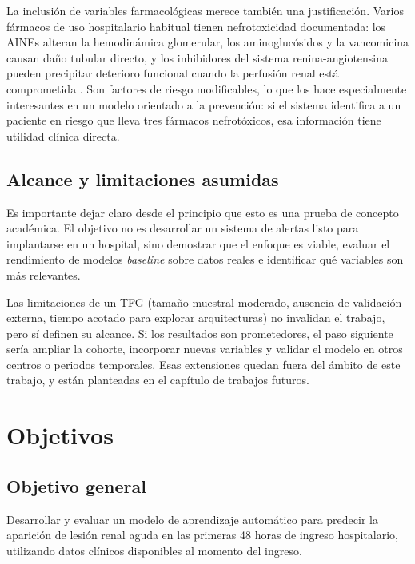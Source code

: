 \documentclass[12pt, a4paper, oneside]{report}
\begin{document}
La inclusión de variables farmacológicas merece también una justificación. Varios fármacos de uso hospitalario habitual tienen nefrotoxicidad documentada: los AINEs alteran la hemodinámica glomerular, los aminoglucósidos y la vancomicina causan daño tubular directo, y los inhibidores del sistema renina-angiotensina pueden precipitar deterioro funcional cuando la perfusión renal está comprometida \parencite{perazella2019drug, perazella2022drugaki}. Son factores de riesgo modificables, lo que los hace especialmente interesantes en un modelo orientado a la prevención: si el sistema identifica a un paciente en riesgo que lleva tres fármacos nefrotóxicos, esa información tiene utilidad clínica directa.

\section{Alcance y limitaciones asumidas}
\label{sec:alcance}

Es importante dejar claro desde el principio que esto es una prueba de concepto académica. El objetivo no es desarrollar un sistema de alertas listo para implantarse en un hospital, sino demostrar que el enfoque es viable, evaluar el rendimiento de modelos \textit{baseline} sobre datos reales e identificar qué variables son más relevantes.

Las limitaciones de un TFG (tamaño muestral moderado, ausencia de validación externa, tiempo acotado para explorar arquitecturas) no invalidan el trabajo, pero sí definen su alcance. Si los resultados son prometedores, el paso siguiente sería ampliar la cohorte, incorporar nuevas variables y validar el modelo en otros centros o periodos temporales. Esas extensiones quedan fuera del ámbito de este trabajo, y están planteadas en el capítulo de trabajos futuros.

\chapter{Objetivos}
\label{chap:objetivos}

\section{Objetivo general}
\label{sec:obj_general}

Desarrollar y evaluar un modelo de aprendizaje automático para predecir la aparición de lesión renal aguda en las primeras 48 horas de ingreso hospitalario, utilizando datos clínicos disponibles al momento del ingreso.
\end{document}
